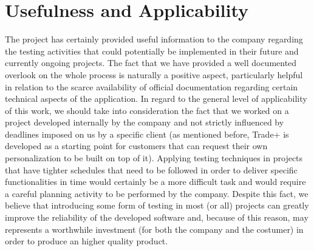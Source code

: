 \section{Usefulness and Applicability} 

The project has certainly provided useful information to the company regarding the testing activities that could potentially be implemented in their future and currently ongoing projects. The fact that we have provided a well documented overlook on the whole process is naturally a positive aspect, particularly helpful in relation to the scarce availability of official documentation regarding certain technical aspects of the application. 
In regard to the general level of applicability of this work, we should take into consideration the fact that we worked on a project developed internally by the company and not strictly influenced by deadlines imposed on us by a specific client (as mentioned before, Trade+ is developed as a starting point for customers that can request their own personalization to be built on top of it). Applying testing techniques in projects that have tighter schedules that need to be followed in order to deliver specific functionalities in time would certainly be a more difficult task and would require a careful planning activity to be performed by the company. Despite this fact, we believe that introducing some form of testing in most (or all) projects can greatly improve the reliability of the developed software and, because of this reason, may represents a worthwhile investment (for both the company and the costumer) in order to produce an higher quality product.